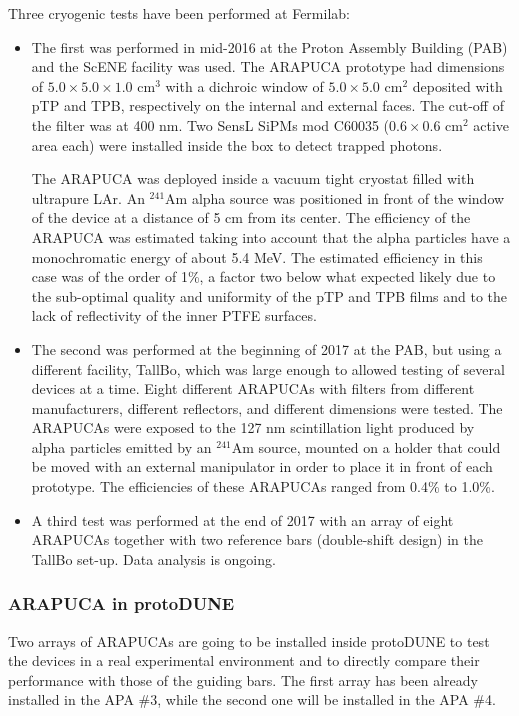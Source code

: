 Three cryogenic tests have been performed at Fermilab:
\begin{itemize}
\item The first  was performed in mid-2016 at the Proton Assembly Building (PAB) and the ScENE facility was used. The ARAPUCA prototype had dimensions of  $5.0 \times 5.0 \times 1.0$ cm$^3$ with a dichroic window of $5.0 \times 5.0$ cm$^2$ deposited with pTP and TPB, respectively on the internal and external faces. The cut-off of the filter was at 400 nm. Two SensL SiPMs mod C60035 ($0.6 \times 0.6$ cm$^2$ active area each) were installed inside the box to detect trapped photons. 

The ARAPUCA was deployed inside a vacuum tight cryostat filled with ultrapure LAr. An $^{241}$Am alpha source was positioned in front of the window of the device at a distance of 5 cm from its center. The efficiency of the ARAPUCA was estimated taking into account that the alpha particles have a  monochromatic energy of about 5.4 MeV. 
The estimated efficiency in this case was of the order of 1\%, a factor two below what expected likely due to the sub-optimal quality and uniformity of the pTP and TPB films and to the lack of reflectivity of the inner PTFE surfaces.

\item The second  was performed at the beginning of 2017 at the PAB, but using a different facility, 
TallBo, which was large enough to allowed testing of several devices at a time. Eight different ARAPUCAs with 
filters from different manufacturers, different reflectors, and different dimensions were tested. The ARAPUCAs 
were exposed to the 127 nm scintillation light produced by alpha particles emitted by an $^{241}$Am 
source, mounted on a holder that could be moved with an external manipulator in order to place it in 
front of each prototype. The efficiencies of these ARAPUCAs ranged from 0.4\% to 1.0\%.

\item A third test was performed at the end of 2017 with an array of eight ARAPUCAs together with two 
reference bars (double-shift design) in the TallBo set-up. Data analysis is  ongoing. 

\end{itemize}

\subsubsection{ARAPUCA in protoDUNE}

Two arrays of ARAPUCAs are going to be installed inside protoDUNE to test the devices in a real experimental environment and to directly compare their performance with those of the guiding bars. The first array has been already installed in the APA \#3, while the second one will be installed in the APA \#4.
 
